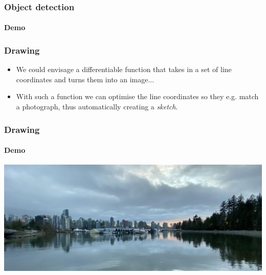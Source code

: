 \documentclass[]{article}
\begin{document}
\begin{frame}
\frametitle{Object detection}
\framesubtitle{Demo}

\end{frame}






\begin{frame}
\frametitle{Drawing}

\begin{itemize}
	\item We could envisage a differentiable function that takes in a set of line coordinates and turns them into an image...
	\item With such a function we can optimise the line coordinates so they e.g. match a photograph, thus automatically creating a \emph{sketch}.
\end{itemize}
\end{frame}

\begin{frame}
\frametitle{Drawing}
\framesubtitle{Demo}

\center
\includegraphics[width=\textwidth]{vancouver.jpg}

\end{frame}
\end{document}
